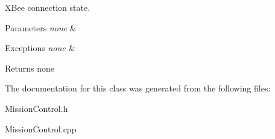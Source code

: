 X\-Bee connection state. 


\begin{DoxyParams}{Parameters}
{\em none} & \\
\hline
\end{DoxyParams}

\begin{DoxyExceptions}{Exceptions}
{\em none} & \\
\hline
\end{DoxyExceptions}
\begin{DoxyReturn}{Returns}
none 
\end{DoxyReturn}


The documentation for this class was generated from the following files\-:\begin{DoxyCompactItemize}
\item 
Mission\-Control.\-h\item 
Mission\-Control.\-cpp\end{DoxyCompactItemize}
